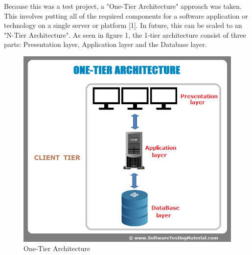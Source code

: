 \documentclass[12pt,a4paper]{article}
\begin{document}
	Because this was a test project, a "One-Tier Architecture" approach was taken. This involves putting all of the required components for a software application or technology on a single server or platform [1]. In future, this can be scaled to an "N-Tier Architecture".  As seen in figure 1, the 1-tier architecture consist of three parts: Presentation layer, Application layer and the Database layer.   
	 
	\begin{figure}[h]
		
			\begin{center}
				
				\includegraphics[scale = 0.3]{one-tier-software-architecture}
			
			\caption{One-Tier Architecture}
			
			\end{center}
			
		\end{figure}
		
\end{document}
